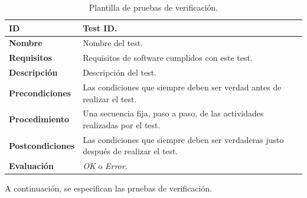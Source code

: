 \begin{center}
\begin{table}[htb]
\centering
\caption{Plantilla de pruebas de verificación.}
\begin{tabular}{@{}p{2.5cm} p{9cm}@{}} 
\toprule
\textbf{ID} 					& Test ID. \\
\midrule
\textbf{Nombre} 				& Nombre del test. \\
\midrule
\textbf{Requisitos} 		& Requisitos de software cumplidos con este test. \\
\midrule
\textbf{Descripción} 		& Descripción del test. \\
\midrule
\textbf{Precondiciones}		& Las condiciones que siempre deben ser verdad antes de realizar el test. \\
\midrule
\textbf{Procedimiento}			& Una secuencia fija, paso a paso, de las actividades realizadas por el test. \\
\midrule
\textbf{Postcondiciones} 		& Las condiciones que siempre deben ser verdaderas justo después de realizar el test. \\
\midrule
\textbf{Evaluación} 			& \textit{OK} o \textit{Error}. \\
\bottomrule
\end{tabular}
\label{tab:verification_tests}
\end{table}
\end{center}

A continuación, se especifican las pruebas de verificación.

